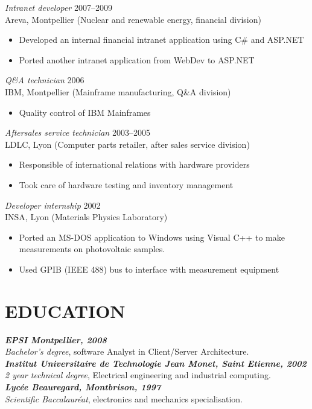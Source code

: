 \documentclass[line,resmargin]{res}
\begin{document}
\begin{resume}
{\sl Intranet developer\/} \hfill 2007--2009 \\
Areva, Montpellier (Nuclear and renewable energy, financial division)
\begin{itemize} \itemsep -2pt
    \item Developed an internal financial intranet application using C\# and ASP.NET
    \item Ported another intranet application from WebDev to ASP.NET
\end{itemize}

{\sl Q\&A technician\/} \hfill 2006 \\
IBM, Montpellier (Mainframe manufacturing, Q\&A division)
\begin{itemize}  \itemsep -2pt
    \item Quality control of IBM Mainframes
\end{itemize}

{\sl Aftersales service technician\/} \hfill     2003--2005 \\
LDLC, Lyon (Computer parts retailer, after sales service division)
\begin{itemize}  \itemsep -2pt
    \item Responsible of international relations with hardware providers
    \item Took care of hardware testing and inventory management
\end{itemize}

{\sl Developer internship\/} \hfill 2002 \\
INSA, Lyon (Materials Physics Laboratory)
\begin{itemize} \itemsep -2pt
    \item Ported an MS-DOS application to Windows using Visual C++ to make
    measurements on photovoltaic samples.
    \item Used GPIB (IEEE 488) bus to interface with measurement equipment
\end{itemize}

\section{EDUCATION}
{\sl \textbf{EPSI Montpellier, 2008}\\
Bachelor's degree}, software Analyst in Client/Server Architecture.\\
{\sl \textbf{Institut Universitaire de Technologie Jean Monet, Saint Etienne, 2002}\\
2 year technical degree}, Electrical engineering and  industrial computing.\\
{\sl \textbf{Lyc\'{e}e Beauregard, Montbrison, 1997} \\
Scientific Baccalaur\'{e}at}, electronics and mechanics specialisation.


\end{resume}
\end{document}

